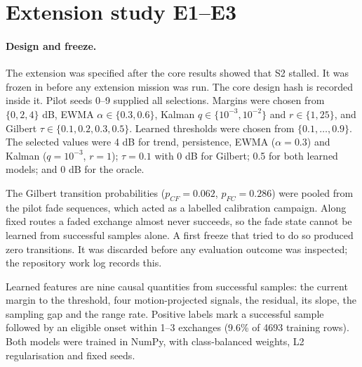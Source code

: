 \clearpage
\section{Extension study E1--E3}\label{app:extension}
\paragraph{Design and freeze.} The extension was specified after the core results showed that S2 stalled. It was frozen in  before any extension mission was run. The core design hash is recorded inside it. Pilot seeds 0--9 supplied all selections. Margins were chosen from $\{0,2,4\}$ dB, EWMA $\alpha\in\{0.3,0.6\}$, Kalman $q\in\{10^{-3},10^{-2}\}$ and $r\in\{1,25\}$, and Gilbert $\tau\in\{0.1,0.2,0.3,0.5\}$. Learned thresholds were chosen from $\{0.1,\dots,0.9\}$. The selected values were 4 dB for trend, persistence, EWMA ($\alpha=0.3$) and Kalman ($q=10^{-3}$, $r=1$); $\tau=0.1$ with 0 dB for Gilbert; 0.5 for both learned models; and 0 dB for the oracle.

The Gilbert transition probabilities ($p_{CF}=0.062$, $p_{FC}=0.286$) were pooled from the pilot fade sequences, which acted as a labelled calibration campaign. Along fixed routes a faded exchange almost never succeeds, so the fade state cannot be learned from successful samples alone. A first freeze that tried to do so produced zero transitions. It was discarded before any evaluation outcome was inspected; the repository work log records this.

Learned features are nine causal quantities from successful samples: the current margin to the threshold, four motion-projected signals, the residual, its slope, the sampling gap and the range rate. Positive labels mark a successful sample followed by an eligible onset within 1--3 exchanges (9.6\% of 4693 training rows). Both models were trained in NumPy, with class-balanced weights, L2 regularisation and fixed seeds.

\begin{table}[htbp]\centering\small
\caption{Held-out fixed-route warning quality (extension seeds 2000--2029, 180 traces) with per-decision counted work and retained binary64 state. Ops are counted arithmetic; transcendental calls are logarithms, square roots, exponentials and tanh. The oracle is not deployable.}\label{tab:predictors}

\end{table}

